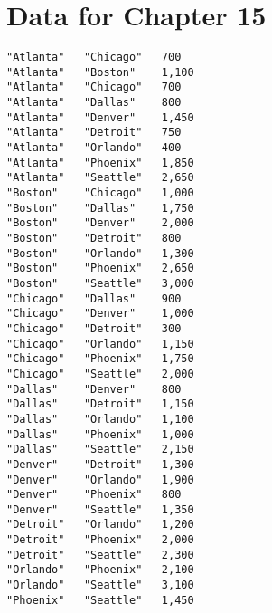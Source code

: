 


\chapter{Data for Chapter 15}
\label{distances}

\begin{verbatim}
"Atlanta"	"Chicago"	700
"Atlanta"	"Boston"	1,100
"Atlanta"	"Chicago"	700
"Atlanta"	"Dallas"	800
"Atlanta"	"Denver"	1,450
"Atlanta"	"Detroit"	750
"Atlanta"	"Orlando"	400
"Atlanta"	"Phoenix"	1,850
"Atlanta"	"Seattle"	2,650
"Boston"	"Chicago"	1,000
"Boston"	"Dallas"	1,750
"Boston"	"Denver"	2,000
"Boston"	"Detroit"	800
"Boston"	"Orlando"	1,300
"Boston"	"Phoenix"	2,650
"Boston"	"Seattle"	3,000
"Chicago"	"Dallas"	900
"Chicago"	"Denver"	1,000
"Chicago"	"Detroit"	300
"Chicago"	"Orlando"	1,150
"Chicago"	"Phoenix"	1,750
"Chicago"	"Seattle"	2,000
"Dallas"	"Denver"	800
"Dallas"	"Detroit"	1,150
"Dallas"	"Orlando"	1,100
"Dallas"	"Phoenix"	1,000
"Dallas"	"Seattle"	2,150
"Denver"	"Detroit"	1,300
"Denver"	"Orlando"	1,900
"Denver"	"Phoenix"	800
"Denver"	"Seattle"	1,350
"Detroit"	"Orlando"	1,200
"Detroit"	"Phoenix"	2,000
"Detroit"	"Seattle"	2,300
"Orlando"	"Phoenix"	2,100
"Orlando"	"Seattle"	3,100
"Phoenix"	"Seattle"	1,450
\end{verbatim}




